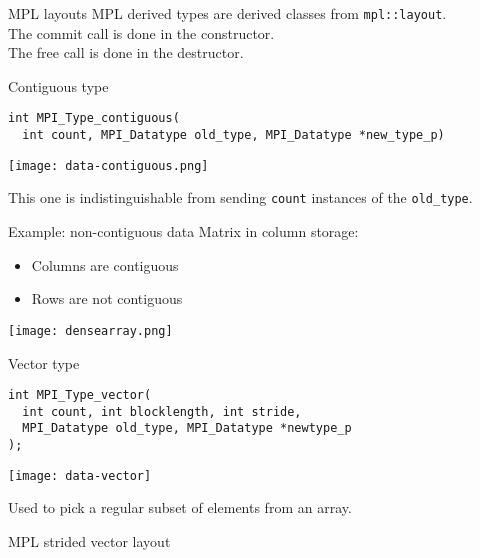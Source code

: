 \begin{mpl}
\begin{numberedframe}{MPL layouts}
  MPL derived types are derived classes from \lstinline{mpl::layout}.\\
  The commit call is done in the constructor.\\
  The free call is done in the destructor.
\end{numberedframe}
\end{mpl}

\begin{numberedframe}{Contiguous type}
\lstset{language=C}
\begin{lstlisting}
int MPI_Type_contiguous(
  int count, MPI_Datatype old_type, MPI_Datatype *new_type_p)  
\end{lstlisting}
  \texttt{[image: data-contiguous.png]}

This one is indistinguishable from sending \lstinline{count} instances
of the \lstinline{old_type}.
\end{numberedframe}

\begin{numberedframe}{Example: non-contiguous data}
  Matrix in column storage:
  \begin{itemize}
  \item Columns are contiguous
  \item Rows are not contiguous
  \end{itemize}
  \texttt{[image: densearray.png]}
\end{numberedframe}

\begin{numberedframe}{Vector type}
\begin{lstlisting}
int MPI_Type_vector(
  int count, int blocklength, int stride,
  MPI_Datatype old_type, MPI_Datatype *newtype_p
);  
\end{lstlisting}
  \texttt{[image: data-vector]}

Used to pick a regular subset of elements from an array.
\end{numberedframe}

\begin{mpl}
\begin{numberedframe}{MPL strided vector layout}


\end{numberedframe}
\end{mpl}

